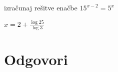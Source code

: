 \begin{vaja}
	izračunaj rešitve enačbe \( 15^{x-2}=5^x\)
  \begin{odgovor}
   	$x=2+\frac{\log25}{\log3}$
  \end{odgovor}
\end{vaja}

\begin{vaja}
  \begin{odgovor}
   
  \end{odgovor}
\end{vaja}






\section{Odgovori}
\label{sec:explog-odgovori}




